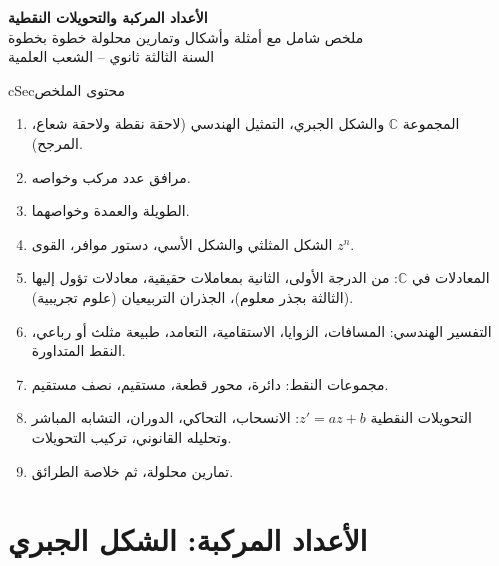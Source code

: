 \documentclass[12pt,a4paper]{article}
\newenvironment{BOX}[2]{\begin{otherlanguage}{english}\begin{arbox}{#1}{#2}}{\end{arbox}\end{otherlanguage}}
\newenvironment{LTR}{\begin{otherlanguage}{english}}{\end{otherlanguage}}
\begin{document}
\begin{LTR}
\begin{tcolorbox}[enhanced,colback=cSec,colframe=cSec,arc=3mm,halign=center,boxrule=0pt,top=12pt,bottom=12pt,before upper={\selectlanguage{arabic}}]
{\color{white}\fontsize{26}{32}\selectfont\bfseries الأعداد المركبة والتحويلات النقطية}\\[8pt]
{\color{white}\large ملخص شامل مع أمثلة وأشكال وتمارين محلولة خطوة بخطوة}\\[5pt]
{\color{white}\large السنة الثالثة ثانوي -- الشعب العلمية}
\end{tcolorbox}
\end{LTR}

\begin{BOX}{cSec}{محتوى الملخص}
\begin{enumerate}[label=\textbf{\arabic*.}]
\item المجموعة $\mathbb{C}$ والشكل الجبري، التمثيل الهندسي (لاحقة نقطة ولاحقة شعاع، المرجح).
\item مرافق عدد مركب وخواصه.
\item الطويلة والعمدة وخواصهما.
\item الشكل المثلثي والشكل الأسي، دستور موافر، القوى $z^n$.
\item المعادلات في $\mathbb{C}$: من الدرجة الأولى، الثانية بمعاملات حقيقية، معادلات تؤول إليها (الثالثة بجذر معلوم)، الجذران التربيعيان (علوم تجريبية).
\item التفسير الهندسي: المسافات، الزوايا، الاستقامية، التعامد، طبيعة مثلث أو رباعي، النقط المتداورة.
\item مجموعات النقط: دائرة، محور قطعة، مستقيم، نصف مستقيم.
\item التحويلات النقطية $z'=az+b$: الانسحاب، التحاكي، الدوران، التشابه المباشر وتحليله القانوني، تركيب التحويلات.
\item تمارين محلولة، ثم خلاصة الطرائق.
\end{enumerate}
\end{BOX}

\section{الأعداد المركبة: الشكل الجبري}
\end{document}
